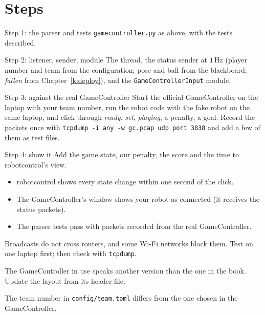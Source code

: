 \section*{Steps}
\begin{stepbox}{Step 1: the parser and tests}
\texttt{gamecontroller.py} as above, with the tests described.
\end{stepbox}
\begin{stepbox}{Step 2: listener, sender, module}
The thread, the status sender at $1$\,Hz (player number and team from the configuration; pose and ball from the blackboard; \emph{fallen} from Chapter~\ref{k:deploy}), and the \texttt{GameControllerInput} module.
\end{stepbox}
\begin{stepbox}{Step 3: against the real GameController}
Start the official GameController on the laptop with your team number, run the robot code with the fake robot on the same laptop, and click through \emph{ready}, \emph{set}, \emph{playing}, a penalty, a goal. Record the packets once with \verb!tcpdump -i any -w gc.pcap udp port 3838! and add a few of them as test files.
\end{stepbox}
\begin{stepbox}{Step 4: show it}
Add the game state, our penalty, the score and the time to robotcontrol's view.
\end{stepbox}

\begin{checkbox}
\begin{itemize}[nosep]
  \item robotcontrol shows every state change within one second of the click.
  \item The GameController's window shows your robot as connected (it receives the status packets).
  \item The parser tests pass with packets recorded from the real GameController.
\end{itemize}
\end{checkbox}

\begin{troublebox}
\begin{description}[leftmargin=0.6cm,nosep]
  \item[No packets] Broadcasts do not cross routers, and some Wi-Fi networks block them. Test on one laptop first; then check with \verb!tcpdump!.
  \item[\emph{version} errors] The GameController in use speaks another version than the one in the book. Update the layout from its header file.
  \item[Our team is never found] The team number in \texttt{config/team.toml} differs from the one chosen in the GameController.
\end{description}
\end{troublebox}

